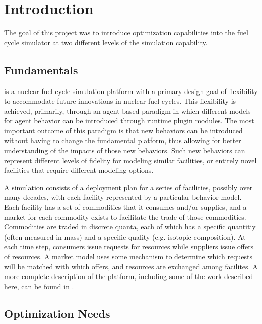 
\section{Introduction}

The goal of this project was to introduce optimization capabilities into the
\Cyclus{} fuel cycle simulator at two different levels of the simulation
capability.  

\subsection{\Cyclus{} Fundamentals}

\Cyclus{} is a nuclear fuel cycle simulation platform with a primary design
goal of flexibility to accommodate future innovations in nuclear fuel cycles.
This flexibility is achieved, primarily, through an agent-based paradigm in
which different models for agent behavior can be introduced through runtime
plugin modules.  The most important outcome of this paradigm is that new
behaviors can be introduced without having to change the fundamental platform,
thus allowing for better understanding of the impacts of those new behaviors.
Such new behaviors can represent different levels of fidelity for modeling
similar facilities, or entirely novel facilities that require different
modeling options.

A \Cyclus{} simulation consists of a deployment plan for a series of
facilities, possibly over many decades, with each facility represented by a
particular behavior model.  Each facility has a set of commodities that it
consumes and/or supplies, and a market for each commodity exists to facilitate
the trade of those commodities.  Commodities are traded in discrete quanta,
each of which has a specific quantitiy (often measured in mass) and a specific
quality (e.g. isotopic composition).  At each time step, consumers issue
requests for resources while suppliers issue offers of resources. A market
model uses some mechanism to determine which requests will be matched with
which offers, and resources are exchanged among facilites.  A more complete
description of the \Cyclus{} platform, including some of the work described
here, can be found in .

\subsection{Optimization Needs}

